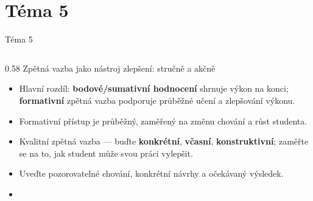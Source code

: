 \documentclass[aspectratio=169]{beamer}
\begin{document}
\section{Téma 5}
\begin{frame}{Téma 5}
\begin{columns}[T,onlytextwidth]
\begin{column}{0.58\textwidth}
\scriptsize
Zpětná vazba jako nástroj zlepšení: stručně a akčně


\begin{itemize}

\tightlist

\item

  Hlavní rozdíl: \textbf{bodové/sumativní hodnocení} shrnuje výkon na konci; \textbf{formativní} zpětná vazba podporuje průběžné učení a zlepšování výkonu.

\end{itemize}


\begin{itemize}

\tightlist

\item

  Formativní přístup je průběžný, zaměřený na změnu chování a růst studenta.

\end{itemize}


\begin{itemize}

\tightlist

\item

  Kvalitní zpětná vazba --- buďte \textbf{konkrétní}, \textbf{včasní}, \textbf{konstruktivní}; zaměřte se na to, jak student může svou práci vylepšit.

\end{itemize}


\begin{itemize}

\tightlist

\item

  Uveďte pozorovatelné chování, konkrétní návrhy a očekávaný výsledek.

\end{itemize}


\begin{itemize}

\tightlist

\item


\end{itemize}
\end{column}
\end{columns}
\end{frame}
\end{document}
